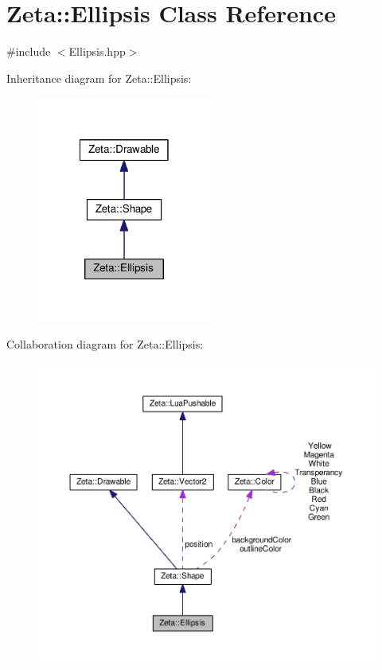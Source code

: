 \hypertarget{classZeta_1_1Ellipsis}{\section{Zeta\+:\+:Ellipsis Class Reference}
\label{classZeta_1_1Ellipsis}
}


{\ttfamily \#include $<$Ellipsis.\+hpp$>$}



Inheritance diagram for Zeta\+:\+:Ellipsis\+:\nopagebreak
\begin{figure}[H]
\begin{center}
\leavevmode
\includegraphics[width=162pt]{classZeta_1_1Ellipsis__inherit__graph}
\end{center}
\end{figure}


Collaboration diagram for Zeta\+:\+:Ellipsis\+:\nopagebreak
\begin{figure}[H]
\begin{center}
\leavevmode
\includegraphics[width=350pt]{classZeta_1_1Ellipsis__coll__graph}
\end{center}
\end{figure}
